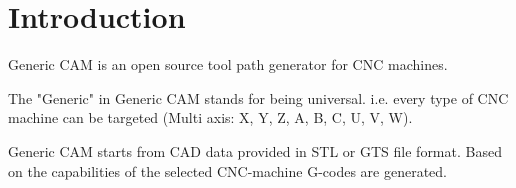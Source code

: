 \chapter{Introduction}

Generic CAM is an open source tool path generator for CNC machines.


The "Generic" in Generic CAM stands for being universal. i.e. every
type of CNC machine can be targeted (Multi axis: X, Y, Z, A, B, C,
U, V, W).


Generic CAM starts from CAD data provided in STL or GTS file format.
Based on the capabilities of the selected CNC-machine G-codes are
generated.
 